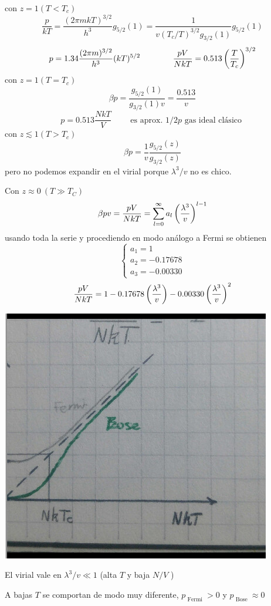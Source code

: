 \documentclass[10pt,oneside]{CBFT_book}
\begin{document}
con $ z = 1 ( T < T_c ) $
\[
	\frac{p}{kT} = \frac{(2\pi m k T)^{3/2}}{h^3} g_{5/2}(1) = 
	\frac{1}{ v (T_c/T)^{3/2} g_{3/2}(1) } g_{5/2}(1)
\]
\[
	p = 1.34 \frac{(2\pi m )^{3/2}}{h^3} (kT)^{5/2} \qquad \qquad 
	\frac{pV}{NkT} = 0.513 \left( \frac{ T }{ T_c } \right)^{3/2}
\]
con $ z = 1 ( T = T_c ) $
\[
	\beta p = \frac{ g_{5/2}(1) }{ g_{3/2}(1) v } = \frac{0.513}{v}
\]
\[
	p = 0.513 \frac{NkT}{V} \qquad \text{ es aprox. $1/2 p$ gas ideal clásico }
\]
con $ z \lesssim 1 ( T > T_c ) $
\[
	\beta p = \frac{1}{v} \frac{ g_{5/2}(z) }{ g_{3/2}(z) }
\]
pero no podemos expandir en el virial porque $ \lambda^3 / v $ no es chico.

Con $ z \approx 0 \: ( T \gg T_C ) $
\[
	\beta p v = \frac{pV}{NkT} = \sum_{l=0}^\infty a_l \left( \frac{ \lambda^3 }{ v } \right)^{l-1}
\]
usando toda la serie y procediendo en modo análogo a Fermi se obtienen
\[
	\begin{cases}
	 a_1 = 1 \\
	 a_2 = -0.17678 \\
	 a_3 = -0.00330
	\end{cases}
\]
\[
	\frac{pV}{NkT} = 1 - 0.17678 \left( \frac{ \lambda^3 }{ v } \right) - 0.00330 \left( \frac{ \lambda^3 }{ v } \right)^2
\]

\includegraphics[scale=0.5]{images/1625624698.jpg}

El virial vale en $\lambda^3/v \ll 1$ (alta $T$ y baja $N/V$ )

A bajas $T$ se comportan de modo muy diferente, $p_{\text{ Fermi }} > 0 $ y
$p_{\text{ Bose }} \approx 0$
\end{document}
